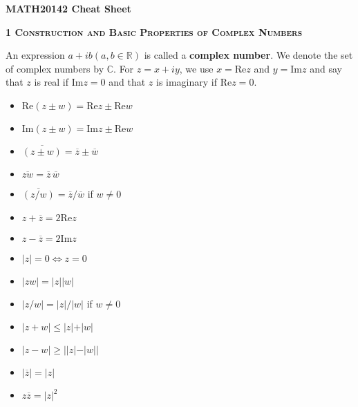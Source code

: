 \documentclass[a4paper]{article}
\newcommand*\conj[1]{\overline{#1}}
\newcommand*\abs[1]{\vert #1 \vert}
\begin{document}

\begin{center}
	\huge{\textbf{MATH20142 Cheat Sheet}}\\
\end{center}

\begin{framed}
	\begin{center}
		\textbf{\textsc{1 Construction and Basic Properties of Complex Numbers}}
	\end{center}
	
	\noindent
	An expression $a + ib (a, b \in \mathbb{R})$ is called a \textbf{complex number}. We denote the set of complex numbers by $\mathbb{C}$. For $z = x + iy$, we use $x = \text{Re}z$ and $y = \text{Im}z$ and say that $z$ is real if $\text{Im}z = 0$ and that $z$ is imaginary if $\text{Re}z = 0$.
	
	\begin{multicols}{3}
		\begin{itemize}
			\item $\text{Re}(z \pm w) = \text{Re}z \pm \text{Re}w$
			\item $\text{Im}(z \pm w) = \text{Im}z \pm \text{Re}w$
			\item $\conj{(z \pm w)} = \conj{z} \pm \conj{w}$
			\item $\conj{zw} = \conj{z} \, \conj{w}$
			\item $\conj{(z/w)} = \conj{z}/\conj{w}$ if $w \neq 0$
			\item $z + \conj{z} = 2\text{Re}z$
			\item $z - \conj{z} = 2\text{Im}z$
			\item $ \abs{z} = 0 \iff z = 0$
			\item $ \abs{zw} = \abs{z} \abs{w}$
			\item $ \abs{z / w} = \abs{z} / \abs{w}$ if $w \neq 0$
			\item $\abs{z + w} \leq \abs{z} + \abs{w}$
			\item $\abs{z - w} \geq \abs{\abs{z} - \abs{w}}$
			\item $\abs{\conj{z}} = \abs{z}$
			\item $z\conj{z} = \abs{z}^2$
		\end{itemize}
	\end{multicols}
\end{framed}
\end{document}
